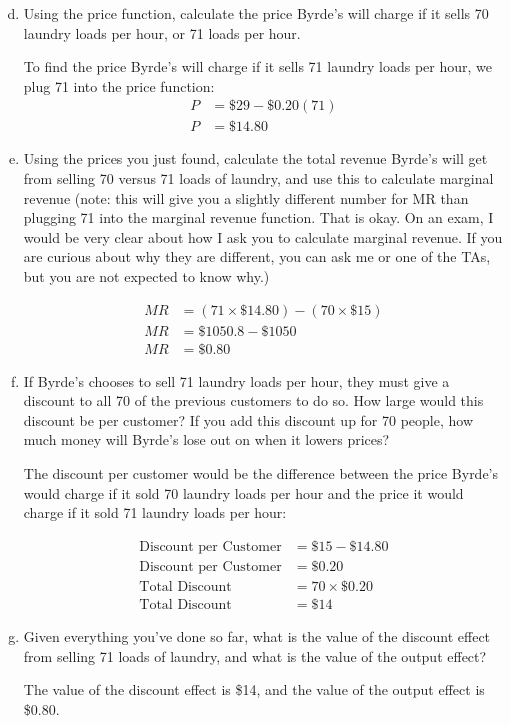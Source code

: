 \documentclass{article}
\begin{document}
\begin{enumerate}[(a)]
    \setcounter{enumi}{3}
    \item Using the price function, calculate the price Byrde's will charge if it sells 70 laundry loads per hour, or 71 loads per hour.
    
    To find the price Byrde's will charge if it sells 71 laundry loads per hour, we plug 71 into the price function:
    \begin{align*}
        P &= \$29 - \$0.20(71) \\
        P &= \$14.80
    \end{align*}
    \pagebreak
    \item Using the prices you just found, calculate the total revenue Byrde's will get from selling 70 versus 71 loads of laundry, and use this to calculate marginal revenue (note: this will give you a slightly different number for MR than plugging 71 into the marginal revenue function. That is okay. On an exam, I would be very clear about how I ask you to calculate marginal revenue. If you are curious about why they are different, you can ask me or one of the TAs, but you are not expected to know why.)
    
    \begin{align*}
        MR &= (71 \times \$14.80) - (70 \times \$15) \\
        MR &= \$1050.8 - \$1050 \\
        MR &= \$0.80
    \end{align*}
    
    \item If Byrde's chooses to sell 71 laundry loads per hour, they must give a discount to all 70 of the previous customers to do so. How large would this discount be per customer? If you add this discount up for 70 people, how much money will Byrde's lose out on when it lowers prices?
    
    The discount per customer would be the difference between the price Byrde's would charge if it sold 70 laundry loads per hour and the price it would charge if it sold 71 laundry loads per hour:

    \begin{align*}
        \text{Discount per Customer} &= \$15 - \$14.80 \\
        \text{Discount per Customer} &= \$0.20 \\
        \text{Total Discount} &= 70 \times \$0.20 \\
        \text{Total Discount} &= \$14
    \end{align*}

    \item Given everything you've done so far, what is the value of the discount effect from selling 71 loads of laundry, and what is the value of the output effect?
    
    The value of the discount effect is \$14, and the value of the output effect is \$0.80.

\end{enumerate}
\end{document}
